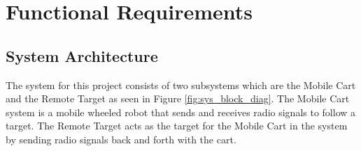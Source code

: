 \documentclass[letterpaper,12pt]{article}   %
\begin{document}

\section{Functional Requirements}
\subsection{System Architecture}
\hspace{\parindent} The system for this project consists of two subsystems which are the Mobile Cart and the Remote Target as seen in Figure \ref{fig:sys_block_diag}. The Mobile Cart system is a mobile wheeled robot that sends and receives radio signals to follow a target. The Remote Target acts as the target for the Mobile Cart in the system by sending radio signals back and forth with the cart.
\end{document}
